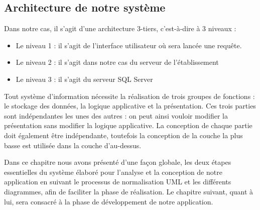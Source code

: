 \subsection{Architecture de notre système}

Dans notre cas, il s’agit d’une architecture 3-tiers, c’est-à-dire à 3 niveaux :

	\begin{itemize}[label=\textbullet, font=\LARGE \color{blue}] 
	\item  Le niveau 1 : il s’agit de l’interface utilisateur où sera lancée une requête.
	\item  Le niveau 2 : il s’agit dans notre cas du serveur de l’établissement
	\item  Le niveau 3 : il s’agit du serveur SQL Server
\end{itemize}

Tout système d’information nécessite la réalisation de trois groupes de fonctions : le stockage des données, la logique applicative et la présentation. Ces trois parties sont indépendantes les unes des autres : on peut ainsi vouloir modifier la présentation sans modifier la logique applicative. La conception de chaque partie doit également être indépendante, toutefois la conception de la couche la plus basse est utilisée dans la couche d’au-dessus.

Dans ce chapitre nous avons présenté d’une façon globale, les deux étapes essentielles du système élaboré pour l’analyse et la conception de notre application en suivant le processus de normalisation UML et les différents diagrammes, afin de faciliter la phase de réalisation.
Le chapitre suivant, quant à lui, sera consacré à la phase de développement de notre application.









